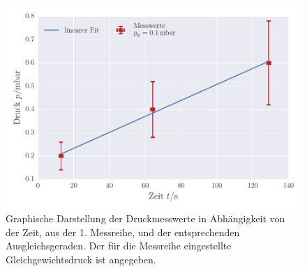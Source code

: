 \begin{figure}[!h]
 \centering
 \includegraphics[scale=0.8]{../Grafiken/Leckrate_Drehschieber_0.pdf}
 \caption{Graphische Darstellung der Druckmesswerte in Abhängigkeit von der Zeit, aus der 1. Messreihe, und der
 	entsprechenden Ausgleichsgeraden. Der für die Messreihe eingestellte Gleichgewichtsdruck ist angegeben.\label{fig:leckrate_drehschieber_0}}
 \end{figure} 
